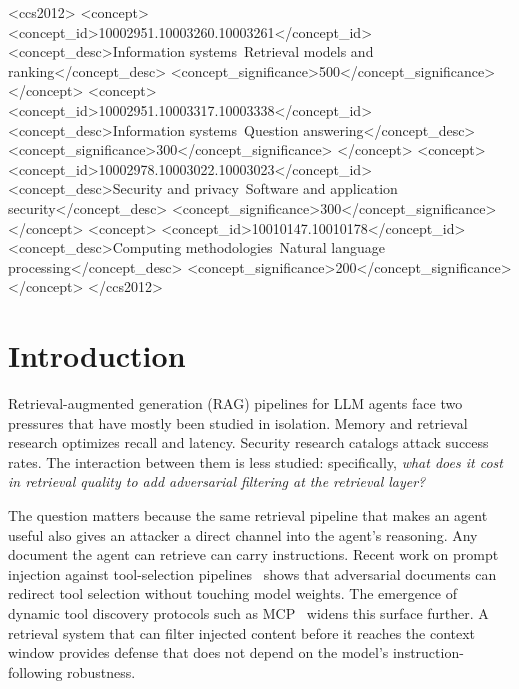 \documentclass[sigconf]{acmart}
\begin{document}
\begin{CCSXML}
<ccs2012>
 <concept>
  <concept_id>10002951.10003260.10003261</concept_id>
  <concept_desc>Information systems~Retrieval models and ranking</concept_desc>
  <concept_significance>500</concept_significance>
 </concept>
 <concept>
  <concept_id>10002951.10003317.10003338</concept_id>
  <concept_desc>Information systems~Question answering</concept_desc>
  <concept_significance>300</concept_significance>
 </concept>
 <concept>
  <concept_id>10002978.10003022.10003023</concept_id>
  <concept_desc>Security and privacy~Software and application security</concept_desc>
  <concept_significance>300</concept_significance>
 </concept>
 <concept>
  <concept_id>10010147.10010178</concept_id>
  <concept_desc>Computing methodologies~Natural language processing</concept_desc>
  <concept_significance>200</concept_significance>
 </concept>
</ccs2012>
\end{CCSXML}


\maketitle

\section{Introduction}

Retrieval-augmented generation (RAG) pipelines for LLM agents face two
pressures that have mostly been studied in isolation. Memory and retrieval
research optimizes recall and latency. Security research catalogs attack
success rates. The interaction between them is less studied: specifically, \emph{what
does it cost in retrieval quality to add adversarial filtering at the retrieval
layer?}

The question matters because the same retrieval pipeline that makes an agent
useful also gives an attacker a direct channel into the agent's reasoning. Any
document the agent can retrieve can carry instructions. Recent work on prompt
injection against tool-selection
pipelines~\cite{shi2025toolhijacker} shows that adversarial documents can
redirect tool selection without touching model weights. The emergence of dynamic
tool discovery protocols such as MCP~\cite{hou2025mcp} widens this surface
further. A retrieval system that can filter injected content before it reaches
the context window provides defense that does not depend on the model's
instruction-following robustness.
\end{document}
